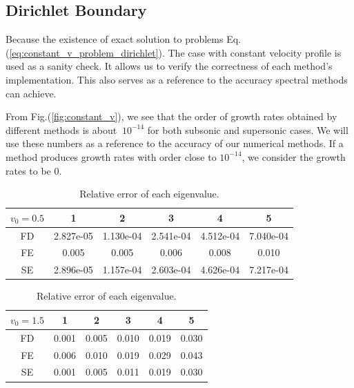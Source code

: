 \subsection{Dirichlet Boundary}
Because the existence of exact solution to problems Eq.(\ref{eq:constant_v_problem_dirichlet}). The case with constant velocity profile is used as a sanity check. It allows us to verify the correctness of each method's implementation. This also serves as a reference to the accuracy spectral methods can achieve.

From Fig.(\ref{fig:constant_v}), we see that the order of growth rates obtained by different methods is about $~10^{-14}$ for both subsonic and supersonic cases. We will use these numbers as a reference to the accuracy of our numerical methods. If a method produces growth rates with order close to $10^{-14}$, we consider the growth rates to be 0.

\begin{table} [H]
	\centering
	\caption{Relative error of each eigenvalue.}
	\begin{tabular}{|c|c|c|c|c|c|}
		\hline
		$v_0=0.5$   & 1 & 2 & 3 & 4 & 5 \\
		\hline
		FD & 2.827e-05 & 1.130e-04 & 2.541e-04 & 4.512e-04 & 7.040e-04 \\
		\hline
		FE & 0.005 & 0.005 & 0.006 & 0.008 & 0.010  \\
		\hline
		SE & 2.896e-05 & 1.157e-04 & 2.603e-04 & 4.626e-04 & 7.217e-04 \\
		\hline
	\end{tabular}
	\begin{tabular}{|c|c|c|c|c|c|}
		\hline
		$v_0=1.5$   & 1 & 2 & 3 & 4 & 5 \\
		\hline
		FD & 0.001 & 0.005 & 0.010 & 0.019 & 0.030 \\
		\hline
		FE & 0.006 & 0.010 & 0.019 & 0.029 & 0.043  \\
		\hline
		SE & 0.001 & 0.005 & 0.011 & 0.019 & 0.030 \\
		\hline
	\end{tabular}
	\label{table:eigenvalue_error_dirichlet}
\end{table}

